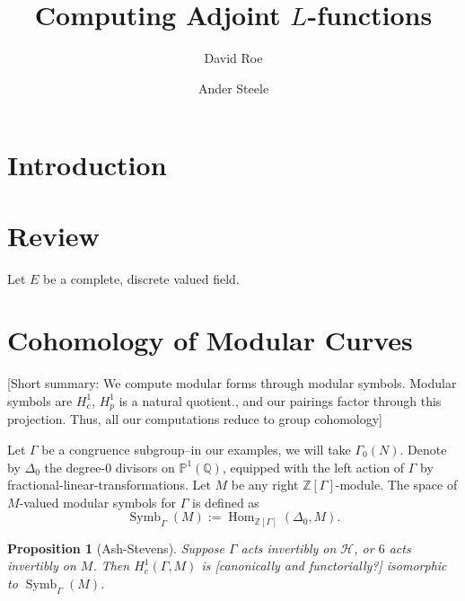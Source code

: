 \documentclass[10pt]{amsart}
\title{Computing Adjoint $L$-functions}
\author{David Roe}
\author{Ander Steele}
\theoremstyle{plain}
\newtheorem{proposition}[theorem]{Proposition}
\theoremstyle{definition}
\newcommand{\ZZ}{{\mathbb{Z}}}
\newcommand{\QQ}{{\mathbb{Q}}}
\newcommand{\cH}{\mathcal{H}}
\DeclareMathOperator{\Hom}{Hom}
\DeclareMathOperator{\Symb}{Symb}
\DeclareMathOperator{\BSymb}{BSymb}
\begin{document}
\maketitle

\section{Introduction}

\section{Review}

Let $E$ be a complete, discrete valued field.  

\section{Cohomology of Modular Curves} \label{sec:mod_curve_cohom}

[Short summary: We compute modular forms through modular symbols. Modular symbols are $H^1_c$, $H^1_p$ is a natural quotient., and our pairings factor through this projection. Thus, all our computations reduce to group cohomology]



Let $\Gamma$ be a congruence subgroup--in our examples, we will take $\Gamma_0(N)$. Denote by $\Delta_0$ the degree-$0$ divisors on $\mathbb{P}^1(\QQ)$, equipped with the left action of $\Gamma$ by fractional-linear-transformations. Let $M$ be any right $\ZZ[\Gamma]$-module. The space of $M$-valued modular symbols for $\Gamma$ is defined as
\begin{equation*}
	\Symb_\Gamma(M) := \Hom_{\ZZ[\Gamma]}(\Delta_0, M).
\end{equation*}

\begin{proposition}[Ash-Stevens]
Suppose $\Gamma$ acts invertibly on $\cH$, or $6$ acts invertibly on $M$. Then $H^1_c(\Gamma,M)$ is [canonically and functorially?] isomorphic to $\Symb_\Gamma(M)$.
\end{proposition}
\end{document}
